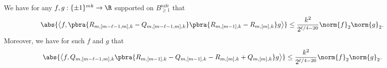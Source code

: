 \begin{lemma}\label{lem:product of operators quadratic form}
    We have for any $f,g:\{\pm1\}^{mk}\to\R$ supported on $B_{\geq1}^{\mathrm{safe}}$ that
    \begin{align*}
        \abs{\left\langle f,\pbra{R_{m,[m-\ell-1,m],k}-Q_{m,[m-\ell-1,m],k}}\pbra{R_{m,[m-1],k}-R_{m,[m],k}}g\right\rangle }\leq \frac{k^2}{2^{\ell/4-20}}\norm{f}_2\norm{g}_2.
    \end{align*}
    Moreover, we have for such $f$ and $g$ that
    \begin{align*}
        \abs{\left\langle f,Q_{m,[m-\ell-1,m],k}\pbra{R_{m,[m-1],k}-Q_{m,[m-1],k}-R_{m,[m],k}+Q_{m,[m],k}}g\right\rangle }\leq \frac{k^2}{2^{\ell/4-20}}\norm{f}_2\norm{g}_2.
    \end{align*}
\end{lemma}
